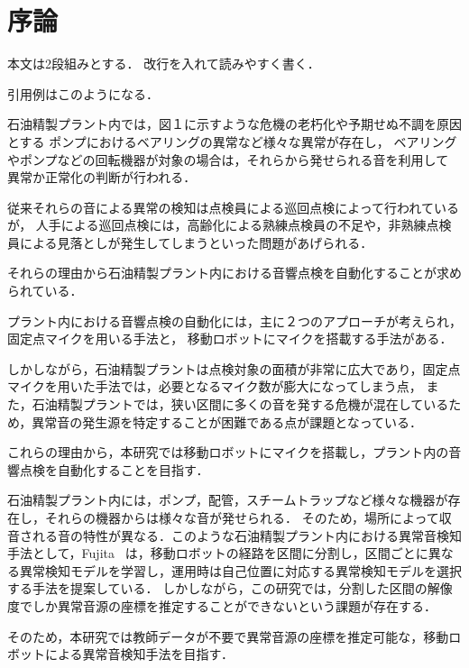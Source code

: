 \documentclass[../main]{subfiles}
\begin{document}
\graphicspath{{../figures/}}

\section{序論}
本文は2段組みとする．
改行を入れて読みやすく書く．

引用例は\cite{Schlick1994}\cite{Chikushi2020}このようになる．

石油精製プラント内では，図１に示すような危機の老朽化や予期せぬ不調を原因とする
ポンプにおけるベアリングの異常など様々な異常が存在し，
ベアリングやポンプなどの回転機器が対象の場合は，それらから発せられる音を利用して
異常か正常化の判断が行われる．

従来それらの音による異常の検知は点検員による巡回点検によって行われているが，
人手による巡回点検には，高齢化による熟練点検員の不足や，非熟練点検員による見落としが発生してしまうといった問題があげられる．

それらの理由から石油精製プラント内における音響点検を自動化することが求められている．


プラント内における音響点検の自動化には，主に２つのアプローチが考えられ，固定点マイクを用いる手法と，
移動ロボットにマイクを搭載する手法がある．

しかしながら，石油精製プラントは点検対象の面積が非常に広大であり，固定点マイクを用いた手法では，必要となるマイク数が膨大になってしまう点，
また，石油精製プラントでは，狭い区間に多くの音を発する危機が混在しているため，異常音の発生源を特定することが困難である点が課題となっている．

これらの理由から，本研究では移動ロボットにマイクを搭載し，プラント内の音響点検を自動化することを目指す．

石油精製プラント内には，ポンプ，配管，スチームトラップなど様々な機器が存在し，それらの機器からは様々な音が発せられる．
そのため，場所によって収音される音の特性が異なる．このような石油精製プラント内における異常音検知手法として，Fujita~\cite{fujita2022}
は，移動ロボットの経路を区間に分割し，区間ごとに異なる異常検知モデルを学習し，運用時は自己位置に対応する異常検知モデルを選択する手法を提案している．
しかしながら，この研究では，分割した区間の解像度でしか異常音源の座標を推定することができないという課題が存在する．


そのため，本研究では教師データが不要で異常音源の座標を推定可能な，移動ロボットによる異常音検知手法を目指す．
\end{document}

